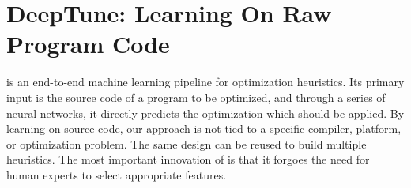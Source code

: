 \section{DeepTune: Learning On Raw Program Code} \label{sec:DeepTune}



\DeepTune is an end-to-end machine learning pipeline for optimization heuristics. Its primary input is the source code
of a program to be optimized, and through a series of neural networks, it directly predicts the optimization which
should be applied. By learning on source code, our approach is not tied to a specific compiler, platform, or
optimization problem. The same design can be reused to build multiple heuristics. The most important innovation of \DeepTune is that it forgoes the need for human experts to select appropriate features. 





